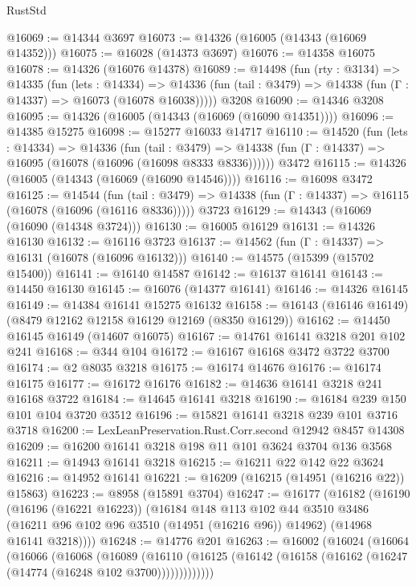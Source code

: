 \begin{lexlean}{RustStd}
\begin{coremodule}
@16069 := @14344 @3697
@16073 := @14326 (@16005 (@14343 (@16069 @14352)))
@16075 := @16028 (@14373 @3697)
@16076 := @14358 @16075
@16078 := @14326 (@16076 @14378)
@16089 := @14498
    (fun (rty : @3134) =>
    @14335
      (fun (lets : @14334) =>
      @14336 (fun (tail : @3479) => @14338 (fun (Γ : @14337) => @16073 (@16078 @16038)))))
    @3208
@16090 := @14346 @3208
@16095 := @14326 (@16005 (@14343 (@16069 (@16090 @14351))))
@16096 := @14385 @15275
@16098 := @15277 @16033 @14717
@16110 := @14520
    (fun (lets : @14334) =>
    @14336
      (fun (tail : @3479) =>
      @14338 (fun (Γ : @14337) => @16095 (@16078 (@16096 (@16098 @8333 @8336))))))
    @3472
@16115 := @14326 (@16005 (@14343 (@16069 (@16090 @14546))))
@16116 := @16098 @3472
@16125 := @14544
    (fun (tail : @3479) => @14338 (fun (Γ : @14337) => @16115 (@16078 (@16096 (@16116 @8336)))))
    @3723
@16129 := @14343 (@16069 (@16090 (@14348 @3724)))
@16130 := @16005 @16129
@16131 := @14326 @16130
@16132 := @16116 @3723
@16137 := @14562 (fun (Γ : @14337) => @16131 (@16078 (@16096 @16132)))
@16140 := @14575 (@15399 (@15702 @15400))
@16141 := @16140 @14587
@16142 := @16137 @16141
@16143 := @14450 @16130
@16145 := @16076 (@14377 @16141)
@16146 := @14326 @16145
@16149 := @14384 @16141 @15275 @16132
@16158 := @16143 (@16146 @16149) (@8479 @12162 @12158 @16129 @12169 (@8350 @16129))
@16162 := @14450 @16145 @16149 (@14607 @16075)
@16167 := @14761 @16141 @3218 @201 @102 @241
@16168 := @344 @104
@16172 := @16167 @16168 @3472 @3722 @3700
@16174 := @2 @8035 @3218
@16175 := @16174 @14676
@16176 := @16174 @16175
@16177 := @16172 @16176
@16182 := @14636 @16141 @3218 @241 @16168 @3722
@16184 := @14645 @16141 @3218
@16190 := @16184 @239 @150 @101 @104 @3720 @3512
@16196 := @15821 @16141 @3218 @239 @101 @3716 @3718
@16200 := LexLeanPreservation.Rust.Corr.second @12942 @8457 @14308
@16209 := @16200 @16141 @3218 @198 @11 @101 @3624 @3704 @136 @3568
@16211 := @14943 @16141 @3218
@16215 := @16211 @22 @142 @22 @3624
@16216 := @14952 @16141
@16221 := @16209 (@16215 (@14951 (@16216 @22)) @15863)
@16223 := @8958 (@15891 @3704)
@16247 := @16177
    (@16182
      (@16190
        (@16196 (@16221 @16223))
        (@16184
          @148
          @113
          @102
          @44
          @3510
          @3486
          (@16211 @96 @102 @96 @3510 (@14951 (@16216 @96)) @14962)
          (@14968 @16141 @3218))))
@16248 := @14776 @201
@16263 := @16002
    (@16024
      (@16064
        (@16066
          (@16068
            (@16089
              (@16110
                (@16125 (@16142 (@16158 (@16162 (@16247 (@14774 (@16248 @102 @3700)))))))))))))

\end{coremodule}
\end{lexlean}
